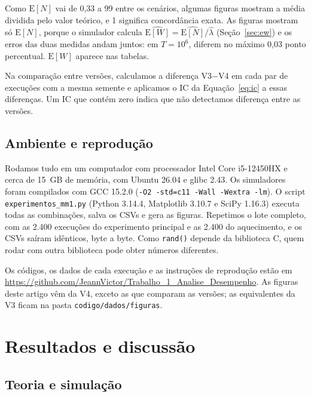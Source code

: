 \documentclass[
  article,      %
  10pt,         %
  oneside,
  a4paper,
  twocolumn,    %
  english,
  brazil        %
]{abntex2}
\newcommand{\EN}{\mathrm{E}[N]}
\newcommand{\EW}{\mathrm{E}[W]}
\begin{document}
Como $\EN$ vai de 0,33 a 99 entre os cenários, algumas figuras mostram a média dividida pelo valor teórico, e 1 significa concordância exata. As figuras mostram só $\EN$, porque o simulador calcula $\widehat{\EW}=\widehat{\EN}/\widehat{\lambda}$ (Seção~\ref{sec:ew}) e os erros das duas medidas andam juntos: em $T=10^6$, diferem no máximo 0,03 ponto percentual. $\EW$ aparece nas tabelas.

Na comparação entre versões, calculamos a diferença V3$-$V4 em cada par de execuções com a mesma semente e aplicamos o IC da Equação~\ref{eq:ic} a essas diferenças. Um IC que contém zero indica que não detectamos diferença entre as versões.

\subsection{Ambiente e reprodução}
\label{sec:ambiente}

Rodamos tudo em um computador com processador Intel Core i5-12450HX e cerca de 15~GB de memória, com Ubuntu 26.04 e glibc 2.43. Os simuladores foram compilados com GCC 15.2.0 (\texttt{-O2 -std=c11 -Wall -Wextra -lm}). O script \texttt{experimentos\_mm1.py} (Python 3.14.4, Matplotlib 3.10.7 e SciPy 1.16.3) executa todas as combinações, salva os CSVs e gera as figuras. Repetimos o lote completo, com as 2.400 execuções do experimento principal e as 2.400 do aquecimento, e os CSVs saíram idênticos, byte a byte. Como \texttt{rand()} depende da biblioteca C, quem rodar com outra biblioteca pode obter números diferentes.

Os códigos, os dados de cada execução e as instruções de reprodução estão em \url{https://github.com/JeannVictor/Trabalho_1_Analise_Desempenho}. As figuras deste artigo vêm da V4, exceto as que comparam as versões; as equivalentes da V3 ficam na pasta \texttt{codigo/dados/figuras}.


\section{Resultados e discussão}

\subsection{Teoria e simulação}
\end{document}
